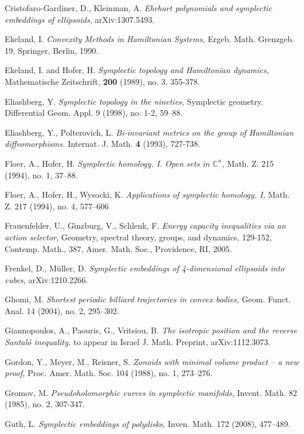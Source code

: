 \documentclass{icmart}
\theoremstyle{definition}
\begin{document}
\begin{thebibliography}{7}
 Cristofaro-Gardiner, D., Kleinman, A. {\it Ehrhart polynomials and symplectic embeddings of ellipsoids}, arXiv:1307.5493.

  Ekeland, I. {\it Convexity Methods in Hamiltonian Systems,}  Ergeb. Math. Grenzgeb. 19, Springer, Berlin, 1990.

 Ekeland, I. and Hofer, H. {\it Symplectic topology
and Hamiltonian dynamics,} Mathematische Zeitschrift, {\bf 200}
(1989), no. 3, 355-378.



 Eliashberg, Y. {\it Symplectic topology in the nineties,}  Symplectic geometry. Differential Geom. Appl. 9 (1998), no. 1-2, 59--88.




 Eliashberg, Y., Polterovich, L. {\it Bi-invariant
metrics on the group of Hamiltonian diffeomorphisms.} Internat. J.
Math. {\bf 4} (1993), 727-738.

 Floer, A.,  Hofer, H. {\it Symplectic homology. I. Open sets in ${\mathbb C}^n$,} Math. Z. 215 (1994), no. 1, 37--88. 

 Floer, A.,  Hofer, H., Wysocki, K.  {\it  Applications of symplectic homology. I,}  Math. Z. 217 (1994), no. 4, 577--606


 Frauenfelder, U., Ginzburg, V., Schlenk, F. {\it Energy capacity
inequalities via an action selector},  Geometry, spectral theory,
groups, and dynamics, 129-152, Contemp. Math., 387, Amer. Math.
Soc., Providence, RI, 2005.

  Frenkel, D.,  M\"uller, D. {\it  Symplectic embeddings of 4-dimensional ellipsoids into cubes}, arXiv:1210.2266.

 Ghomi, M. {\it Shortest periodic billiard trajectories in convex bodies, }
Geom. Funct. Anal. 14 (2004), no. 2, 295--302. 

 Giannopoulos, A., Paouris, G., Vritsiou, B. {\it The isotropic position and the reverse Santal\'o inequality,}
to appear in Israel J. Math. Preprint, arXiv:1112.3073.

 Gordon, Y., Meyer,  M.,  Reisner, S. {\it Zonoids with minimal
volume product -- a new proof,} Proc. Amer. Math. Soc.
104 (1988), no. 1, 273--276.

 Gromov, M. {\it Pseudoholomorphic curves in symplectic manifolds}, Invent. Math. 82 (1985), no. 2, 307-347.

 Guth, L. {\it  Symplectic embeddings of polydisks,} Inven. Math. 172 (2008), 477--489.


\end{thebibliography}
\end{document}

